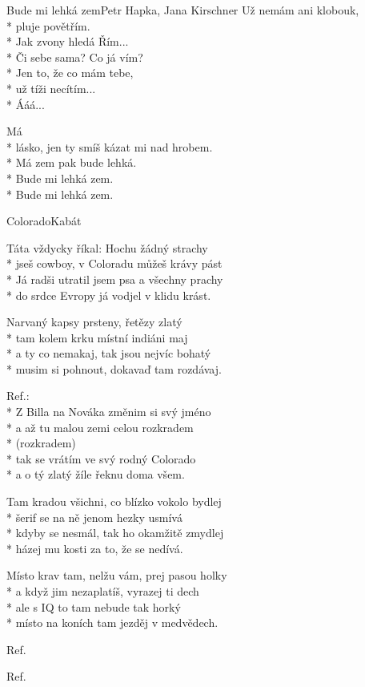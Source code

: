 \documentclass[10.5pt]{book}
\newcommand\tab[1][1cm]{\hspace*{#1}}
\begin{document}
\begin{poem}{Bude mi lehká zem}{Petr Hapka, Jana Kirschner}
Už nemám ani klobouk,\\*
pluje povětřím.\\*
Jak zvony hledá Řím...\\*
Či sebe sama? Co já vím?\\*
Jen to, že co mám tebe,\\*
už tíži necítím...\\*
Ááá...

Má\\*
lásko, jen ty smíš kázat mi nad hrobem.\\*
Má zem pak bude lehká.\\*
Bude mi lehká zem.\\*
Bude mi lehká zem.

\end{poem}
\iffalse
\begin{poem}{Colorado}{Kabát}

\settowidth{\versewidth}{Já radši utratil jsem psa a všechny prachy}

Táta vždycky říkal: Hochu žádný strachy\\*
jseš cowboy, v Coloradu můžeš krávy pást\\*
Já radši utratil jsem psa a všechny prachy\\*
do srdce Evropy já vodjel v klidu krást.

Narvaný kapsy prsteny, řetězy zlatý\\*
tam kolem krku místní indiáni maj\\*
a ty co nemakaj, tak jsou nejvíc bohatý\\*
musim si pohnout, dokavaď tam rozdávaj.

Ref.:\\*
Z Billa na Nováka změnim si svý jméno\\*
a až tu malou zemi celou rozkradem\\*
\tab (rozkradem)\\*
tak se vrátím ve svý rodný Colorado\\*
a o tý zlatý žíle řeknu doma všem.

Tam kradou všichni, co blízko vokolo bydlej\\*
šerif se na ně jenom hezky usmívá\\*
kdyby se nesmál, tak ho okamžitě zmydlej\\*
házej mu kosti za to, že se nedívá.

Místo krav tam, nelžu vám, prej pasou holky\\*
a když jim nezaplatíš, vyrazej ti dech\\*
ale s IQ to tam nebude tak horký\\*
místo na koních tam jezděj v medvědech.

Ref.

Ref.

\end{poem}
\end{document}
